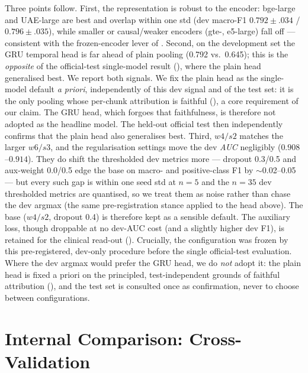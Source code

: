 \documentclass[conference]{IEEEtran}
\begin{document}
Three points follow. First, the representation is robust to the encoder: bge-large
and UAE-large are best and overlap within one std (dev macro-F1
$0.792\!\pm\!.034$ / $0.796\!\pm\!.035$), while smaller or causal/weaker encoders
(gte-, e5-large) fall off --- consistent with the frozen-encoder lever of
. Second, on the development set the
GRU temporal head is far ahead of plain pooling (0.792 vs.\ 0.645); this is the
\emph{opposite} of the official-test single-model result (),
where the plain head generalised best. We report both signals. We fix the plain
head as the single-model default \emph{a priori}, independently of this dev signal
and of the test set: it is the only pooling whose per-chunk attribution is faithful
(), a core requirement of our claim.
The GRU head, which forgoes that faithfulness, is therefore not adopted as the
headline model. The held-out official test then independently confirms that the
plain head also generalises best. Third, $w4/s2$ matches the larger $w6/s3$, and the regularisation settings move
the dev \emph{AUC} negligibly ($0.908$--$0.914$). They do shift the thresholded
dev metrics more --- dropout 0.3/0.5 and aux-weight 0.0/0.5 edge the base on
macro- and positive-class F1 by $\sim$0.02--0.05 --- but every such gap is within
one seed std at $n{=}5$ and the $n{=}35$ dev thresholded metrics are quantised,
so we treat them as noise rather than chase the dev argmax (the same
pre-registration stance applied to the head above). The base ($w4/s2$,
dropout 0.4) is therefore kept as a sensible default. The auxiliary loss, though
droppable at no dev-AUC cost (and a slightly higher dev F1), is retained for the
clinical read-out (). Crucially, the configuration was frozen by this pre-registered,
dev-only procedure before the single official-test evaluation. Where the dev
argmax would prefer the GRU head, we do \emph{not} adopt it:
the plain head is fixed a priori on the principled, test-independent grounds of
faithful attribution (), and the test set is consulted once
as confirmation, never to choose between configurations.

\section{Internal Comparison: Cross-Validation}
\label{sec:internal}
\end{document}
